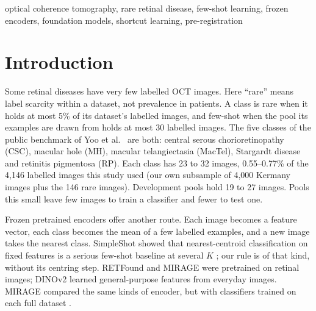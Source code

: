 \documentclass[conference]{IEEEtran}
\begin{document}
\begin{IEEEkeywords}
optical coherence tomography, rare retinal disease, few-shot learning, frozen encoders, foundation models, shortcut learning, pre-registration
\end{IEEEkeywords}

\section{Introduction}
\label{sec:intro}
Some retinal diseases have very few labelled OCT images. Here ``rare'' means label scarcity within a dataset, not prevalence in patients. A class is rare when it holds at most 5\% of its dataset's labelled images, and few-shot when the pool its examples are drawn from holds at most 30 labelled images.
The five classes of the public benchmark of Yoo et al.\ \cite{Yoo2021} are both: central serous chorioretinopathy (CSC), macular hole (MH), macular telangiectasia (MacTel), Stargardt disease and retinitis pigmentosa (RP). Each class has 23 to 32 images, 0.55--0.77\% of the 4,146 labelled images this study used (our own subsample of 4,000 Kermany images plus the 146 rare images). Development pools hold 19 to 27 images.
Pools this small leave few images to train a classifier and fewer to test one.

Frozen pretrained encoders offer another route. Each image becomes a feature vector, each class becomes the mean of a few labelled examples, and a new image takes the nearest class. SimpleShot showed that nearest-centroid classification on fixed features is a serious few-shot baseline at several $K$ \cite{SimpleShot2019}; our rule is of that kind, without its centring step.
RETFound \cite{RETFound2023} and MIRAGE \cite{MIRAGE2025} were pretrained on retinal images; DINOv2 \cite{DINOv2} learned general-purpose features from everyday images. MIRAGE compared the same kinds of encoder, but with classifiers trained on each full dataset \cite{MIRAGE2025}.
\end{document}
